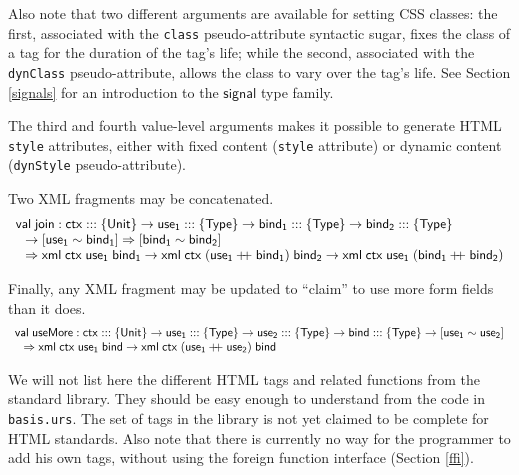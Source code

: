 \documentclass{article}
\newcommand{\cd}[1]{\texttt{#1}}
\newcommand{\mt}[1]{\mathsf{#1}}
\newcommand{\rc}{+ \hspace{-.075in} + \;}
\begin{document}
Also note that two different arguments are available for setting CSS classes: the first, associated with the \texttt{class} pseudo-attribute syntactic sugar, fixes the class of a tag for the duration of the tag's life; while the second, associated with the \texttt{dynClass} pseudo-attribute, allows the class to vary over the tag's life.  See Section \ref{signals} for an introduction to the $\mt{signal}$ type family.

The third and fourth value-level arguments makes it possible to generate HTML \cd{style} attributes, either with fixed content (\cd{style} attribute) or dynamic content (\cd{dynStyle} pseudo-attribute).

Two XML fragments may be concatenated.
$$\begin{array}{l}
  \mt{val} \; \mt{join} : \mt{ctx} ::: \{\mt{Unit}\} \to \mt{use_1} ::: \{\mt{Type}\} \to \mt{bind_1} ::: \{\mt{Type}\} \to \mt{bind_2} ::: \{\mt{Type}\} \\
  \hspace{.1in} \to [\mt{use_1} \sim \mt{bind_1}] \Rightarrow [\mt{bind_1} \sim \mt{bind_2}] \\
  \hspace{.1in} \Rightarrow \mt{xml} \; \mt{ctx} \; \mt{use_1} \; \mt{bind_1} \to \mt{xml} \; \mt{ctx} \; (\mt{use_1} \rc \mt{bind_1}) \; \mt{bind_2} \to \mt{xml} \; \mt{ctx} \; \mt{use_1} \; (\mt{bind_1} \rc \mt{bind_2})
\end{array}$$

Finally, any XML fragment may be updated to ``claim'' to use more form fields than it does.
$$\begin{array}{l}
  \mt{val} \; \mt{useMore} : \mt{ctx} ::: \{\mt{Unit}\} \to \mt{use_1} ::: \{\mt{Type}\} \to \mt{use_2} ::: \{\mt{Type}\} \to \mt{bind} ::: \{\mt{Type}\} \to [\mt{use_1} \sim \mt{use_2}] \\
  \hspace{.1in} \Rightarrow \mt{xml} \; \mt{ctx} \; \mt{use_1} \; \mt{bind} \to \mt{xml} \; \mt{ctx} \; (\mt{use_1} \rc \mt{use_2}) \; \mt{bind}
\end{array}$$

We will not list here the different HTML tags and related functions from the standard library.  They should be easy enough to understand from the code in \texttt{basis.urs}.  The set of tags in the library is not yet claimed to be complete for HTML standards.  Also note that there is currently no way for the programmer to add his own tags, without using the foreign function interface (Section \ref{ffi}).
\end{document}
